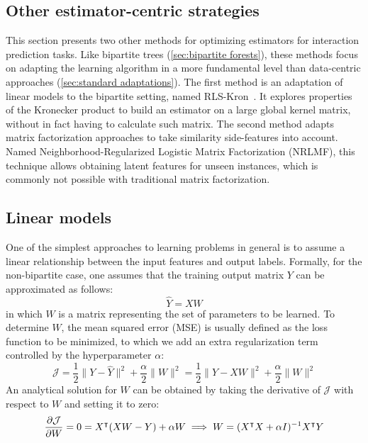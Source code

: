 
\begin{apendicesenv}
\partapendices

\chapter{Other estimator-centric strategies}
\label{sec:estimator-centric}

This section presents two other methods for optimizing estimators for interaction prediction tasks.
Like bipartite trees (\autoref{sec:bipartite forests}), these methods focus on adapting the learning algorithm in a more fundamental level than data-centric approaches (\autoref{sec:standard adaptations}). 
The first method is an adaptation of linear models to the bipartite setting, named RLS-Kron~\cite{vanlaarhoven2011gaussian}. It explores properties of the Kronecker product to build an estimator on a large global kernel matrix, without in fact having to calculate such matrix.
The second method adapts matrix factorization approaches to take similarity side-features into account. Named Neighborhood-Regularized Logistic Matrix Factorization (NRLMF), this technique allows obtaining latent features for unseen instances, which is commonly not possible with traditional matrix factorization.

\section{Linear models}
\label{sec:linear_models}

One of the simplest approaches to learning problems in general is to assume a linear relationship between the input features and output labels. Formally, for the non-bipartite case, one assumes that the training output matrix $Y$ can be approximated as follows:
%
\begin{equation}
    \hat Y = X W
\end{equation}
%
in which $W$ is a matrix representing the set of parameters to be learned. To determine $W$, the mean squared error (MSE) is usually defined as the loss function to be minimized, to which we add an extra regularization term controlled by the hyperparameter $\alpha$:
%
\begin{equation}
    \mathcal{J} = \frac{1}{2} \|Y - \hat Y\|^2 + \frac{\alpha}{2} \|W\|^2
    = \frac{1}{2} \|Y - XW\|^2 + \frac{\alpha}{2} \|W\|^2
\end{equation}
%
An analytical solution for $W$ can be obtained by taking the derivative of $\mathcal{J}$ with respect to $W$ and setting it to zero:
%
\begin{equation} %
    \frac{\partial \mathcal{J}}{\partial W} = 0
    = X\T (XW - Y) + \alpha W
    \implies W = (X\T X + \alpha I)^{-1} X\T Y
\end{equation}


\end{apendicesenv}
